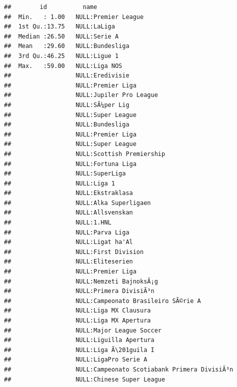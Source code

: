 \documentclass{article}\usepackage[]{graphicx}\usepackage[]{color}
\makeatletter
\newenvironment{kframe}{%
 \def\at@end@of@kframe{}%
 \ifinner\ifhmode%
  \def\at@end@of@kframe{\end{minipage}}%
  \begin{minipage}{\columnwidth}%
 \fi\fi%
 \def\FrameCommand##1{\hskip\@totalleftmargin \hskip-\fboxsep
 \colorbox{shadecolor}{##1}\hskip-\fboxsep
     \hskip-\linewidth \hskip-\@totalleftmargin \hskip\columnwidth}%
 \MakeFramed {\advance\hsize-\width
   \@totalleftmargin\z@ \linewidth\hsize
   \@setminipage}}%
 {\par\unskip\endMakeFramed%
 \at@end@of@kframe}
\newenvironment{knitrout}{}{} %
\makeatother
\begin{document}
\begin{knitrout}
\begin{kframe}
\begin{verbatim}
##        id          name                                        
##  Min.   : 1.00   NULL:Premier League                           
##  1st Qu.:13.75   NULL:LaLiga                                   
##  Median :26.50   NULL:Serie A                                  
##  Mean   :29.60   NULL:Bundesliga                               
##  3rd Qu.:46.25   NULL:Ligue 1                                  
##  Max.   :59.00   NULL:Liga NOS                                 
##                  NULL:Eredivisie                               
##                  NULL:Premier Liga                             
##                  NULL:Jupiler Pro League                       
##                  NULL:SÃ¼per Lig                               
##                  NULL:Super League                             
##                  NULL:Bundesliga                               
##                  NULL:Premier Liga                             
##                  NULL:Super League                             
##                  NULL:Scottish Premiership                     
##                  NULL:Fortuna Liga                             
##                  NULL:SuperLiga                                
##                  NULL:Liga 1                                   
##                  NULL:Ekstraklasa                              
##                  NULL:Alka Superligaen                         
##                  NULL:Allsvenskan                              
##                  NULL:1.HNL                                    
##                  NULL:Parva Liga                               
##                  NULL:Ligat ha'Al                              
##                  NULL:First Division                           
##                  NULL:Eliteserien                              
##                  NULL:Premier Liga                             
##                  NULL:Nemzeti BajnoksÃ¡g                       
##                  NULL:Primera DivisiÃ³n                        
##                  NULL:Campeonato Brasileiro SÃ©rie A           
##                  NULL:Liga MX Clausura                         
##                  NULL:Liga MX Apertura                         
##                  NULL:Major League Soccer                      
##                  NULL:Liguilla Apertura                        
##                  NULL:Liga Ã\201guila I                           
##                  NULL:LigaPro Serie A                          
##                  NULL:Campeonato Scotiabank Primera DivisiÃ³n  
##                  NULL:Chinese Super League                     

\end{verbatim}
\end{kframe}
\end{knitrout}
\end{document}
